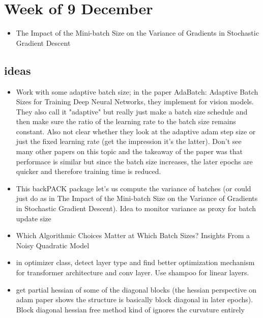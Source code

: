 \documentclass[12pt]{article}
\begin{document}
\section*{Week of 9 December}
\begin{itemize}
\item The Impact of the Mini-batch Size on the
Variance of Gradients in Stochastic Gradient Descent

\end{itemize}



\subsection*{ideas}
\begin{itemize}
\item Work with some adaptive batch size; in the paper AdaBatch: Adaptive Batch Sizes for Training Deep Neural Networks, they implement for vision models. They also call it "adaptive" but really just make a batch size schedule and then make sure the ratio of the learning rate to the batch size remains constant. Also not clear whether they look at the adaptive adam step size or just the fixed learning rate (get the impression it's the latter). Don't see many other papers on this topic and the takeaway of the paper was that performace is similar but since the batch size increases, the later epochs are quicker and therefore training time is reduced.
\item This backPACK package let's us compute the variance of batches (or could just do as in The Impact of the Mini-batch Size on the
Variance of Gradients in Stochastic Gradient Descent). Idea to monitor variance as proxy for batch update size
\item Which Algorithmic Choices Matter at Which Batch
Sizes? Insights From a Noisy Quadratic Model
\item in optimizer class, detect layer type and find better optimization mechanism for transformer architecture and conv layer. Use shampoo for linear layers. 
\item get partial hessian of some of the diagonal blocks  (the hessian perspective on adam paper shows the structure is basically block diagonal in later epochs). Block diagonal hessian free method kind of ignores the curvature entirely 
\end{itemize}
\end{document}
